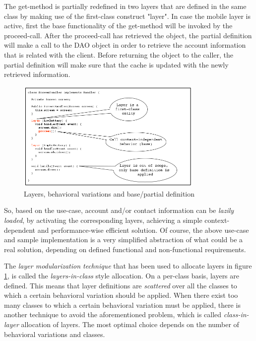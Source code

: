 \documentclass{acm_proc_article-sp}
\begin{document}
The get-method is partially redefined in two layers that are defined in the same class by making use of the first-class construct "layer". In case the mobile layer is active, first the base functionality of the get-method will be invoked by the proceed-call. After the proceed-call has retrieved the object, the partial definition will make a call to the DAO object in order to retrieve the account information that is related with the client. Before returning the object to the caller, the partial definition will make sure that the cache is updated with the newly retrieved information. 
\begin{figure}[H]
\centering
\includegraphics[width=90mm]{layers_toy.png}
\caption{Layers, behavioral variations and base/partial definition}
\label{fig:layers}
\end{figure}
So, based on the use-case, account and/or contact information can be \textit{lazily loaded}, by activating the corresponding layers, achieving a simple context-dependent and performance-wise efficient solution. Of course, the above use-case and sample implementation is a very simplified abstraction of what could be a real solution, depending on defined functional and non-functional requirements.

The \textit{layer modularization technique }that has been used to allocate layers in figure \ref{fig:layers}, is called the \textit{layers-in-class} style allocation. On a per-class basis, layers are defined. This means that layer definitions are \textit{scattered} over all the classes to which a certain behavioral variation should be applied. When there exist too many classes to which a certain behavioral variation must be applied, there is another technique to avoid the aforementioned problem, which is called \textit{class-in-layer} allocation of layers. The most optimal choice depends on the number of behavioral variations and classes.
\end{document}
